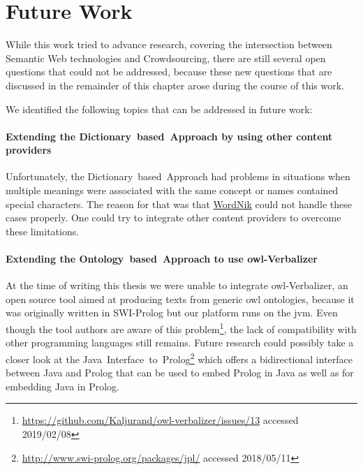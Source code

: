 


\section{Future Work}\label{sec:future_work}
While this work tried to advance research, covering the intersection between Semantic Web technologies and Crowdsourcing, there are still several open questions that could not be addressed, because these new questions that are discussed in the remainder of this chapter arose during the course of this work.

We identified the following topics that can be addressed in future work:

\paragraph{Extending the Dictionary~based~Approach by using other content providers}
Unfortunately, the Dictionary~based~Approach had problems in situations when multiple meanings were associated with the same concept or names contained special characters. The reason for that was that \hyperref[sec:wordnik]{WordNik} could not handle these cases properly. One could try to integrate other content providers to overcome these limitations. 

\paragraph{Extending the Ontology~based~Approach to use \gls{owl}-Verbalizer}
At the time of writing this thesis we were unable to integrate \gls{owl}-Verbalizer, an open source tool aimed at producing texts from generic \gls{owl} ontologies, because it was originally written in SWI-Prolog but our platform runs on the \gls{jvm}. Even though the tool authors are aware of this problem\footnote{\url{https://github.com/Kaljurand/owl-verbalizer/issues/13} accessed 2019/02/08}, the lack of compatibility with other programming languages still remains. Future research could possibly take a closer look at the Java~Interface~to~Prolog\footnote{\url{http://www.swi-prolog.org/packages/jpl/} accessed 2018/05/11} which offers a bidirectional interface between Java and Prolog that can be used to embed Prolog in Java as well as for embedding Java in Prolog. 

